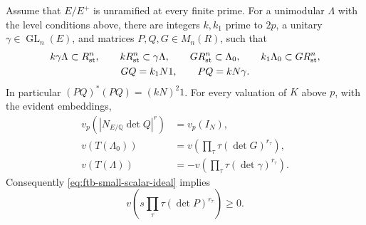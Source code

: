 \begin{srlemma}
\label{lem:ftb-adapted-matrices}
Assume that \(E/E^+\) is unramified at every finite prime.
For a unimodular \(\Lambda\) with the level conditions above, there
are integers \(k,k_1\) prime to \(2p\), a unitary
\(\gamma\in\operatorname{GL}_n(E)\), and matrices
\(P,Q,G\in M_n(R)\), such that
\[
 \begin{gathered}
 k\gamma\Lambda\subset R^n_{\rm st},\qquad
 kR^n_{\rm st}\subset\gamma\Lambda,\qquad
 GR^n_{\rm st}\subset\Lambda_0,\qquad
 k_1\Lambda_0\subset GR^n_{\rm st},\\
 GQ=k_1N1,\qquad
                         PQ=kN\gamma .
 \end{gathered}
\]
In particular \((PQ)^*(PQ)=(kN)^2 1\).
For every valuation of \(K\) above \(p\), with the evident embeddings,
\begin{align}
 v_p\!\left(|N_{E/\mathbb Q}\det Q|^r\right)&=v_p(I_N),
                                                \label{eq:ftb-index-cancel}\\
 v(T(\Lambda_0))&=v\!\left(\prod_\tau\tau(\det G)^{r_\tau}\right),\\
 v(T(\Lambda))&=-v\!\left(\prod_\tau\tau(\det\gamma)^{r_\tau}\right).
\end{align}
Consequently \eqref{eq:ftb-small-scalar-ideal} implies
\begin{equation}\label{eq:ftb-adapted-scalar-integral}
                  v\!\left(s\prod_\tau\tau(\det P)^{r_\tau}\right)
                         \ge0 .
\end{equation}
\end{srlemma}

